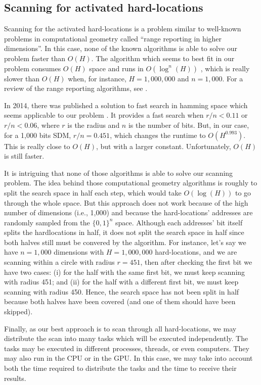 \subsection{Scanning for activated hard-locations}

Scanning for the activated hard-locations is a problem similar to well-known problems in computational geometry called ``range reporting in higher dimensions''. In this case, none of the known algorithms is able to solve our problem faster than $O(H)$. The algorithm which seems to best fit in our problem consumes $O(H)$ space and runs in $O(\log^n(H))$ \citep{chazelle1988functional}, which is really slower than $O(H)$ when, for instance, $H=1,000,000$ and $n=1,000$. For a review of the range reporting algorithms, see \citet{chan2011orthogonal}.

In 2014, there was published a solution to fast search in hamming space which seems applicable to our problem \citet{norouzi2014fast}. It provides a fast search when $r/n < 0.11$ or $r/n < 0.06$, where $r$ is the radius and $n$ is the number of bits. But, in our case, for a 1,000 bits SDM, $r/n = 0.451$, which changes the runtime to $O(H^{0.993})$. This is really close to $O(H)$, but with a larger constant. Unfortunately, $O(H)$ is still faster.

It is intriguing that none of those algorithms is able to solve our scanning problem. The idea behind those computational geometry algorithms is roughly to split the search space in half each step, which would take $O(\log(H))$ to go through the whole space. But this approach does not work because of the high number of dimensions (i.e., 1,000) and because the hard-locations' addresses are randomly sampled from the $\{0, 1\}^n$ space. Although each addresses' bit itself splits the hardlocations in half, it does not split the search space in half since both halves still must be convered by the algorithm. For instance, let's say we have $n=1,000$ dimensions with $H=1,000,000$ hard-locations, and we are scanning within a circle with radius $r=451$, then after checking the first bit we have two cases: (i) for the half with the same first bit, we must keep scanning with radius 451; and (ii) for the half with a different first bit, we must keep scanning with radius 450. Hence, the search space has not been split in half because both halves have been covered (and one of them should have been skipped).

Finally, as our best approach is to scan through all hard-locations, we may distribute the scan into many tasks which will be executed independently. The tasks may be executed in different processes, threads, or even computers. They may also run in the CPU or in the GPU. In this case, we may take into account both the time required to distribute the tasks and the time to receive their results.

